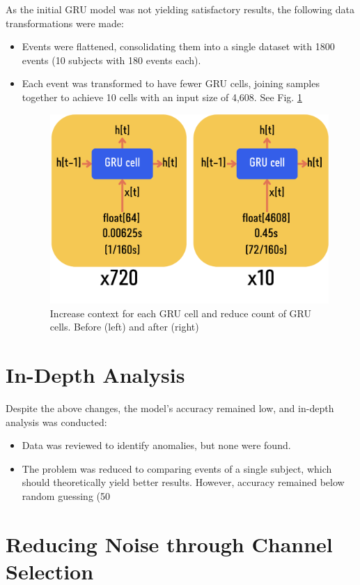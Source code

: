 \documentclass[11pt, a4paper, oneside]{assets/tex/thesis} %
\begin{document}
{As the initial GRU model was not yielding satisfactory results, the following data transformations were made:

\begin{itemize}
    \item Events were flattened, consolidating them into a single dataset with 1800 events (10 subjects with 180 events each).
    \item Each event was transformed to have fewer GRU cells, joining samples together to achieve 10 cells with an input size of 4,608. See Fig. \ref{fig:joining_events_gru_cell}
    \begin{figure}[h]
        \centering
        \includegraphics[width=0.5\linewidth]{assets/img/joining_events_gru_cell.png}
        \caption{Increase context for each GRU cell and reduce count of GRU cells. Before (left) and after (right)}
        \label{fig:joining_events_gru_cell}
    \end{figure}
\end{itemize}


\section{In-Depth Analysis}

Despite the above changes, the model's accuracy remained low, and in-depth analysis was conducted:

\begin{itemize}
    \item Data was reviewed to identify anomalies, but none were found.
    \item The problem was reduced to comparing events of a single subject, which should theoretically yield better results. However, accuracy remained below random guessing (50%
\end{itemize}

\section{Reducing Noise through Channel Selection}

}
\end{document}
